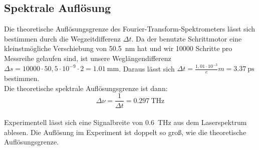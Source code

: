 \documentclass[10pt,a4paper]{article}
\begin{document}
\subsection{Spektrale Auflösung}
Die theoretische Auflösungsgrenze des Fourier-Transform-Spektrometers lässt sich bestimmen durch die Wegzeitdifferenz $\Delta t$. Da der benutzte Schrittmotor eine kleinstmögliche Verschiebung von \qty{50,5}{\nm} hat und wir 10000 Schritte pro Messreihe gelaufen sind, ist unsere Weglängendifferenz $\Delta s = 10000 \cdot 50,5 \cdot 10^{-9} \cdot 2 = \qty{1,01}{\mm}$.
Daraus lässt sich $\Delta t = \frac{1,01 \cdot 10^{-3}}{c}\si{m} = \qty{3,37}{\ps}$ bestimmen.\\
Die theoretische spektrale Auflösungsgrenze ist dann:
$$\Delta\nu=\frac{1}{\Delta t}=\qty{0,297}{\tera\hertz}$$
\\
Experimentell lässt sich eine Signalbreite von \qty{0,6}{\tera\hertz} aus dem Laserspektrum ablesen. Die Auflösung im Experiment ist doppelt so groß, wie die theoretische Auflösungsgrenze.
\end{document}
